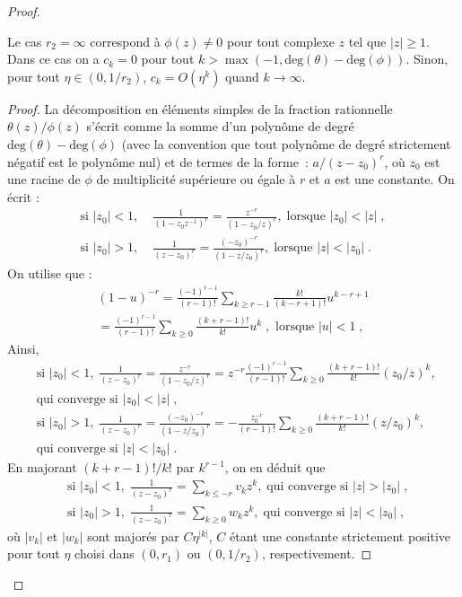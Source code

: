 \begin{proof}
\begin{lemma}
Le cas $r_2=\infty$ correspond \`a $\phi(z)\neq0$ pour tout complexe $z$ tel que
$|z|\geq1$. Dans ce cas on a $c_k=0$ pour tout $k>\max(-1,\mathrm{deg}(\theta)
- \mathrm{deg}(\phi))$.  Sinon, pour tout $\eta\in(0,1/r_2)$, $c_k=O(\eta^{k})$
quand $k\to\infty$.
\end{lemma}
\begin{proof}\smartqed
  La d\'ecomposition en \'el\'ements simples de la fraction rationnelle
  $\theta(z)/\phi(z)$ s'\'ecrit comme la somme d'un polyn\^ome de degr\'e
  $\mathrm{deg}(\theta) - \mathrm{deg}(\phi)$ (avec la convention que tout
  polyn\^ome de degr\'e strictement n\'egatif est le polyn\^ome nul) et de termes de la forme~:
  $a/(z-z_0)^r$, o\`u $z_0$ est une racine de $\phi$ de multiplicit\'e sup\'erieure
  ou \'egale \`a $r$ et $a$ est une constante.  On \'ecrit :
\begin{align*}
\textrm{si }|z_0|<1,& \;
\frac{1}{(1-z_0 z^{-1})^r}=\frac{z^{-r}}{(1-z_0/z)^r},\;
\textrm{lorsque }|z_0|<|z|\;,\\
\textrm{si }|z_0|>1,& \;
\frac{1}{(z-z_0)^r}=\frac{(-z_0)^{-r}}{(1-z/z_0)^r},\;
\textrm{lorsque }|z|<|z_0|\;.
\end{align*}
On utilise que :
\begin{multline*}
(1-u)^{-r}=\frac{(-1)^{r-1}}{(r-1)!}\sum_{k\geq r-1}\frac{k!}{(k-r+1)!}
u^{k-r+1}\\
=\frac{(-1)^{r-1}}{(r-1)!}\sum_{k\geq 0}\frac{(k+r-1)!}{k!}
u^{k}\;,\textrm{ lorsque }|u|<1\;,
\end{multline*}
Ainsi,
\begin{align*}
&\textrm{si }|z_0|<1, \;
\frac{1}{(z-z_0)^r}=\frac{z^{-r}}{(1-z_0/z)^r}
=z^{-r}\frac{(-1)^{r-1}}{(r-1)!}\sum_{k\geq 0}\frac{(k+r-1)!}{k!}(z_0/z)^k,\; \\
&\textrm{qui converge si }|z_0|<|z|\;,\\
&\textrm{si }|z_0|>1, \;
\frac{1}{(z-z_0)^r}=\frac{(-z_0)^{-r}}{(1-z/z_0)^r}
=-\frac{z_0^{-r}}{(r-1)!}\sum_{k\geq 0}\frac{(k+r-1)!}{k!}
(z/z_0)^k,\; \\
&\textrm{qui converge si }|z|<|z_0|\;.
\end{align*}
En majorant $(k+r-1)!/k!$ par $k^{r-1}$, on en d\'eduit  que
\begin{align*}
&\textrm{si }|z_0|<1, \;
\frac{1}{(z-z_0)^r}=\sum_{k\leq -r} v_k z^k,\; \textrm{qui converge si }|z|>|z_0|\;,\\
&\textrm{si }|z_0|>1, \;
\frac{1}{(z-z_0)^r}=\sum_{k\geq 0} w_k z^k,\;\textrm{qui converge si }|z|<|z_0|\;,
\end{align*}
o\`u $|v_k|$ et $|w_k|$ sont major\'es par $C \eta^{|k|}$, $C$ \'etant une constante
strictement positive pour tout $\eta$ choisi dans
$(0,r_1)$ ou $(0,1/r_2)$, respectivement.


\end{proof}
\end{proof}
